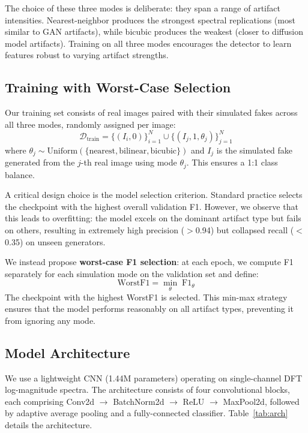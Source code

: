 \documentclass[11pt,a4paper]{article}
\begin{document}
The choice of these three modes is deliberate: they span a range of artifact intensities. Nearest-neighbor produces the strongest spectral replications (most similar to GAN artifacts), while bicubic produces the weakest (closer to diffusion model artifacts). Training on all three modes encourages the detector to learn features robust to varying artifact strengths.

\subsection{Training with Worst-Case Selection}

Our training set consists of real images paired with their simulated fakes across all three modes, randomly assigned per image:
\begin{equation}
    \mathcal{D}_{\mathrm{train}} = \{(I_i, 0)\}_{i=1}^{N} \cup \{(I_j, 1, \theta_j)\}_{j=1}^{N}
\end{equation}
where $\theta_j \sim \mathrm{Uniform}(\{\text{nearest}, \text{bilinear}, \text{bicubic}\})$ and $I_j$ is the simulated fake generated from the $j$-th real image using mode $\theta_j$. This ensures a 1:1 class balance.

A critical design choice is the model selection criterion. Standard practice selects the checkpoint with the highest overall validation F1. However, we observe that this leads to overfitting: the model excels on the dominant artifact type but fails on others, resulting in extremely high precision ($>$0.94) but collapsed recall ($<$0.35) on unseen generators.

We instead propose \textbf{worst-case F1 selection}: at each epoch, we compute F1 separately for each simulation mode on the validation set and define:
\begin{equation}
    \mathrm{WorstF1} = \min_{\theta}\; \mathrm{F1}_\theta
\end{equation}
The checkpoint with the highest WorstF1 is selected. This min-max strategy ensures that the model performs reasonably on all artifact types, preventing it from ignoring any mode.

\subsection{Model Architecture}

We use a lightweight CNN (1.44M parameters) operating on single-channel DFT log-magnitude spectra. The architecture consists of four convolutional blocks, each comprising Conv2d $\to$ BatchNorm2d $\to$ ReLU $\to$ MaxPool2d, followed by adaptive average pooling and a fully-connected classifier. Table~\ref{tab:arch} details the architecture.
\end{document}
